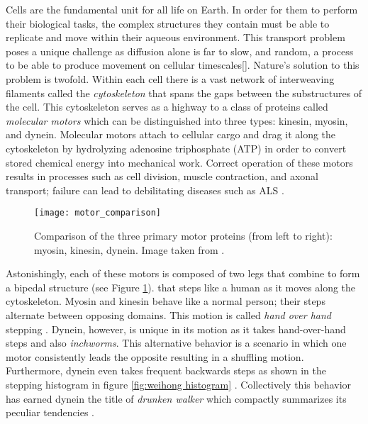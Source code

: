Cells are the fundamental unit for all life on Earth. In order
for them to perform their biological tasks, the complex structures they contain
must be able to replicate and move within their aqueous environment. This
transport problem  poses a unique challenge as diffusion alone is far to slow,
and random, a process to be able to produce movement on cellular timescales[].
Nature's solution to this problem is twofold. Within each cell there is a vast network of interweaving filaments called the \textit{cytoskeleton} that spans the gaps between the substructures of the cell. This cytoskeleton serves as a highway to a class of proteins called \textit{molecular motors} which can be distinguished into three types: kinesin, myosin, and dynein. Molecular motors attach to cellular cargo and drag it along the cytoskeleton by hydrolyzing adenosine triphosphate (ATP) in order to convert stored chemical energy into mechanical work\cite{alberts2002molecular}. Correct operation of these motors results in processes such as cell division, muscle contraction, and axonal transport; failure can lead to debilitating diseases such as ALS \cite{boillee2006disease}. 

\begin{figure}[!hbt]
	\centering 
	\texttt{[image: motor\_comparison]}
	\caption{Comparison of the three primary motor proteins (from left to right): myosin, kinesin, dynein. Image taken from \cite{philips__nodate}.}
	\label{fig:motor proteins} 
\end{figure}

Astonishingly, each of these motors is composed of two legs that combine to form a bipedal structure (see Figure \ref{fig:motor proteins}). that steps like a human as it moves along the cytoskeleton. Myosin and kinesin behave like a normal person; their steps alternate between opposing domains. This motion is called \textit{hand over hand} stepping \cite{goldman2009drunk}. Dynein, however, is unique in its motion as it takes hand-over-hand steps and also \textit{inchworms}. This alternative behavior is a scenario in which one motor consistently leads the opposite resulting in a shuffling motion. Furthermore, dynein even takes frequent backwards steps as shown in the stepping histogram in figure \ref{fig:weihong histogram} \cite{qiu2012dynein}. Collectively this behavior has earned dynein the title of \textit{drunken walker} which compactly summarizes its peculiar tendencies \cite{goldman2009drunk}. \\


